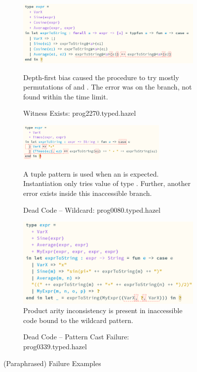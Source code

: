 \begin{figure}
\centering
\begin{subfigure}{1\textwidth}
\includegraphics[width=1\textwidth]{Media/Figures/witness_exists}

Depth-first bias caused the procedure to try mostly permutations of  and . The error was on the  branch, not found within the time limit.
\caption{Witness Exists: prog2270.typed.hazel}
\end{subfigure}

\begin{subfigure}{1\textwidth}
\includegraphics[width=0.8\textwidth]{Media/Figures/dead_code_pattern_instantiation}

A tuple pattern is used when an  is expected. Instantiation only tries value of type . Further, another error exists inside this inaccessible branch.
\caption{Dead Code -- Wildcard: prog0080.typed.hazel}
\end{subfigure}

\begin{subfigure}{0.7\textwidth}
\includegraphics[width=1\textwidth]{Media/Figures/dead_code_wildcard}
Product arity inconsistency is present in inaccessible code bound to the wildcard pattern.
\caption{Dead Code -- Pattern Cast Failure: prog0339.typed.hazel}
\end{subfigure}
\caption{(Paraphrased) Failure Examples}
\label{fig:FailureExamples}
\end{figure}